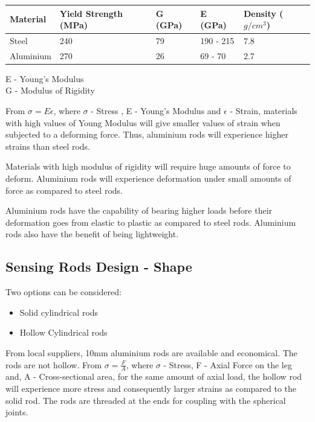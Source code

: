 \begin{tabular}{|l|l|l|l|l|}
\hline
\textbf{Material} & \textbf{Yield Strength (MPa)} & \textbf{G (GPa)} & \textbf{E (GPa)} & \textbf{Density ($g/cm^3$)}\\
\hline
Steel & 240 & 79 & 190 - 215 & 7.8\\
\hline
Aluminium & 270 & 26 & 69 - 70 & 2.7\\
\hline
\end{tabular}

E - Young's Modulus\\
G - Modulus of Rigidity

From $ \sigma = E \epsilon $, where $\sigma$ - Stress , E - Young's Modulus and $ \epsilon$ - Strain, materials with high values of Young Modulus will give smaller values of strain when subjected to a deforming force. Thus, aluminium rods will experience higher strains than steel rods.

Materials with high modulus of rigidity will require huge amounts of force to deform. Aluminium rods will experience deformation under small amounts of force as compared to steel rods.

Aluminium rods have the capability of bearing higher loads before their deformation goes from elastic to plastic as compared to steel rods. Aluminium rods also have the benefit of being lightweight.



\subsection{Sensing Rods Design - Shape}
Two options can be considered:
\begin{itemize}
\item Solid cylindrical rods
\item Hollow Cylindrical rods
\end{itemize}
From local suppliers, 10mm aluminium rods are available and economical. The rods are not hollow. From $\sigma = \frac{F}{A}$, where $\sigma$ - Stress, F - Axial Force on the leg and, A - Cross-sectional area, for the same amount of axial load, the hollow rod will experience more stress and consequently larger strains as compared to the solid rod. The rods are threaded at the ends for coupling with the spherical joints.

